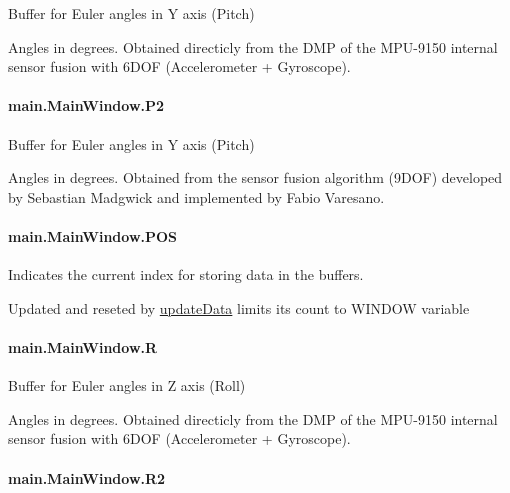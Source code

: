 Buffer for Euler angles in Y axis (Pitch) 

Angles in degrees. Obtained directicly from the D\-M\-P of the M\-P\-U-\/9150 internal sensor fusion with 6\-D\-O\-F (Accelerometer + Gyroscope). \hypertarget{classmain_1_1_main_window_a27dae11aa90ae75ad58556b5f872d05e}{
\paragraph[{P2}]{\setlength{\rightskip}{0pt plus 5cm}main.\-Main\-Window.\-P2}}\label{classmain_1_1_main_window_a27dae11aa90ae75ad58556b5f872d05e}


Buffer for Euler angles in Y axis (Pitch) 

Angles in degrees. Obtained from the sensor fusion algorithm (9\-D\-O\-F) developed by Sebastian Madgwick and implemented by Fabio Varesano. \hypertarget{classmain_1_1_main_window_ac295e7edaa6b0c00592ea04ecd01ce78}{
\paragraph[{P\-O\-S}]{\setlength{\rightskip}{0pt plus 5cm}main.\-Main\-Window.\-P\-O\-S}}\label{classmain_1_1_main_window_ac295e7edaa6b0c00592ea04ecd01ce78}


Indicates the current index for storing data in the buffers. 

Updated and reseted by \hyperlink{classmain_1_1_main_window_ac92cdbf6322bf71a1222ac4be72bb6c0}{update\-Data} limits its count to W\-I\-N\-D\-O\-W variable \hypertarget{classmain_1_1_main_window_a5a2a696186b46f2c1ab6d843781717bb}{
\paragraph[{R}]{\setlength{\rightskip}{0pt plus 5cm}main.\-Main\-Window.\-R}}\label{classmain_1_1_main_window_a5a2a696186b46f2c1ab6d843781717bb}


Buffer for Euler angles in Z axis (Roll) 

Angles in degrees. Obtained directicly from the D\-M\-P of the M\-P\-U-\/9150 internal sensor fusion with 6\-D\-O\-F (Accelerometer + Gyroscope). \hypertarget{classmain_1_1_main_window_a1a7ef29e7427ad606b2aacd8e1993e66}{
\paragraph[{R2}]{\setlength{\rightskip}{0pt plus 5cm}main.\-Main\-Window.\-R2}}\label{classmain_1_1_main_window_a1a7ef29e7427ad606b2aacd8e1993e66}


